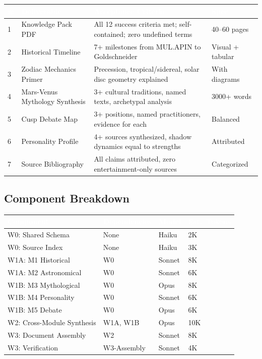 \documentclass[11pt,letterpaper]{article}
\newcommand{\tableheader}[1]{\textbf{\sffamily\textcolor{white}{#1}}}
\begin{document}
\begin{center}
\begin{tabularx}{\textwidth}{C{0.5cm}L{4cm}XL{2.5cm}}
\toprule
{}
\tableheader{\#} & \tableheader{Deliverable} & \tableheader{Acceptance Criteria} & \tableheader{Spec} \\
 & Knowledge Pack PDF & All 12 success criteria met; self-contained; zero undefined terms & 40--60 pages \\
2 & Historical Timeline & 7+ milestones from MUL.APIN to Goldschneider & Visual + tabular \\
3 & Zodiac Mechanics Primer & Precession, tropical/sidereal, solar disc geometry explained & With diagrams \\
4 & Mars-Venus Mythology Synthesis & 3+ cultural traditions, named texts, archetypal analysis & 3000+ words \\
5 & Cusp Debate Map & 3+ positions, named practitioners, evidence for each & Balanced \\
6 & Personality Profile & 4+ sources synthesized, shadow dynamics equal to strengths & Attributed \\
7 & Source Bibliography & All claims attributed, zero entertainment-only sources & Categorized \\
\bottomrule
\end{tabularx}
\end{center}

\subsection{Component Breakdown}

\begin{center}
\begin{tabularx}{\textwidth}{L{3.5cm}L{2cm}C{1.5cm}C{1.5cm}}
\toprule
{}
\tableheader{Component} & \tableheader{Dependencies} & \tableheader{Model} & \tableheader{Est.\ Tokens} \\
\midrule
W0: Shared Schema & None & Haiku & 2K \\
W0: Source Index & None & Haiku & 3K \\
W1A: M1 Historical & W0 & Sonnet & 8K \\
W1A: M2 Astronomical & W0 & Sonnet & 6K \\
W1B: M3 Mythological & W0 & Opus & 8K \\
W1B: M4 Personality & W0 & Sonnet & 6K \\
W1B: M5 Debate & W0 & Opus & 6K \\
W2: Cross-Module Synthesis & W1A, W1B & Opus & 10K \\
W3: Document Assembly & W2 & Sonnet & 8K \\
W3: Verification & W3-Assembly & Sonnet & 4K \\
\bottomrule
\end{tabularx}
\end{center}
\end{document}
